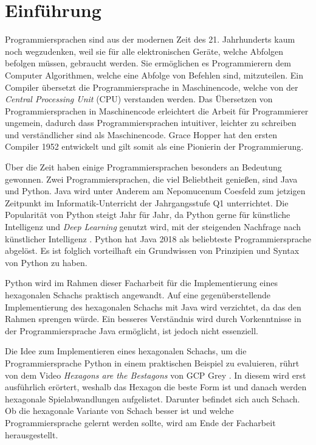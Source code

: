 \chapter{Einführung}
Programmiersprachen sind aus der modernen Zeit des 21. Jahrhunderts kaum noch wegzudenken, weil sie für alle elektronischen Geräte, welche Abfolgen befolgen müssen, gebraucht werden. Sie ermöglichen es Programmierern dem Computer Algorithmen, welche eine Abfolge von Befehlen sind, mitzuteilen. Ein Compiler übersetzt die Programmiersprache in Maschinencode, welche von der \textit{Central Processing Unit} (CPU) verstanden werden. Das Übersetzen von Programmiersprachen in Maschinencode erleichtert die Arbeit für Programmierer ungemein, dadurch dass Programmiersprachen intuitiver, leichter zu schreiben und verständlicher sind als Maschinencode. Grace Hopper hat den ersten Compiler 1952 entwickelt und gilt somit als eine Pionierin der Programmierung. \par Über die Zeit haben einige Programmiersprachen besonders an Bedeutung gewonnen. Zwei Programmiersprachen, die viel Beliebtheit genießen, sind Java und Python. Java wird unter Anderem am Nepomucenum Coesfeld zum jetzigen Zeitpunkt im Informatik-Unterricht der Jahrgangsstufe Q1 unterrichtet. Die Popularität von Python steigt Jahr für Jahr, da Python gerne für künstliche Intelligenz und \textit{Deep Learning} genutzt wird, mit der steigenden Nachfrage nach künstlicher Intelligenz \cite{Github:PYPL}\cite{Gray:2017}. Python hat Java 2018 als beliebteste Programmiersprache abgelöst. Es ist folglich vorteilhaft ein Grundwissen von Prinzipien und Syntax von Python zu haben. \par Python wird im Rahmen dieser Facharbeit für die Implementierung eines hexagonalen Schachs praktisch angewandt. Auf eine gegenüberstellende Implementierung des hexagonalen Schachs mit Java wird verzichtet, da das den Rahmen sprengen würde. Ein besseres Verständnis wird durch Vorkenntnisse in der Programmiersprache Java ermöglicht, ist jedoch nicht essenziell. \par Die Idee zum Implementieren eines hexagonalen Schachs, um die Programmiersprache Python in einem praktischen Beispiel zu evaluieren, rührt von dem Video \textit{Hexagons are the Bestagons} von GCP Grey \cite{Grey:Bestagons}. In diesem wird erst ausführlich erörtert, weshalb das Hexagon die beste Form ist und danach werden hexagonale Spielabwandlungen aufgelistet. Darunter befindet sich auch Schach. Ob die hexagonale Variante von Schach besser ist und welche Programmiersprache gelernt werden sollte, wird am Ende der Facharbeit herausgestellt. \cite{Louis:2010}
